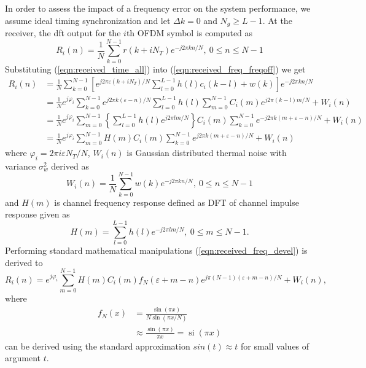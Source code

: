 In order to assess the impact of a frequency error on the system performance, we assume ideal timing synchronization and let $\Delta k = 0$ and $N_g \geq L-1$.
At the receiver, the \gls{dft} output for the $i$th OFDM symbol is computed as
%
\begin{equation}
\label{eqn:received_freq_freqoff}
R_i(n) =\frac{1}{N} \sum_{k=0}^{N-1} r(k+iN_T)e^{-j2\pi k n/N} ,\ 0 \leq n \leq N-1
\end{equation}
%
Substituting (\ref{eqn:received_time_all}) into (\ref{eqn:received_freq_freqoff}) we get
%
\begin{equation}
\label{eqn:received_freq_devel}
\begin{split}
R_i(n)
&=\frac{1}{N}\sum_{k=0}^{N-1}{\left[ e^{j2\pi \varepsilon(k+iN_T)/N}\sum_{l=0}^{L-1} {h(l)c_i(k-l)}+w(k)\right] e^{-j2\pi kn/N}}\\
&=\frac{1}{N}e^{j\varphi_i}\sum_{k=0}^{N-1}{e^{j2\pi k(\varepsilon-n)/N}}\sum_{l=0}^{L-1} {h(l)\sum_{m=0}^{N-1}{C_i(m)e^{j2\pi (k-l)m/N}}}+W_i(n)\\
&=\frac{1}{N}e^{j\varphi_i} \sum_{m=0}^{N-1} \left\lbrace \sum_{l=0}^{L-1} h(l)e^{j2\pi lm/N}\right\rbrace C_i(m)\sum_{k=0}^{N-1} e^{-j2\pi k (m+\varepsilon -n)/N}+W_i(n)\\
&=\frac{1}{N}e^{j\varphi_i} \sum_{m=0}^{N-1} H(m) C_i(m)\sum_{k=0}^{N-1} e^{j2\pi k (m+\varepsilon -n)/N} +W_i(n)
\end{split}
\end{equation}
%
%
where $\varphi_i = 2\pi i \varepsilon N_T/N$, $W_i(n)$ is Gaussian distributed thermal noise with variance $\sigma_{w}^2$ derived as
%
\begin{equation}
\label{eqn:noise_freq}
W_i(n) =\frac{1}{N} \sum_{k=0}^{N-1} w(k)e^{-j2\pi k n/N} ,\ 0 \leq n \leq N-1
\end{equation}
%
and $H(m)$ is {channel frequency response} defined as DFT of channel impulse response given as
%
\begin{equation}
\label{eqn:CFR}
H(m) =\sum_{l=0}^{L-1} h(l)e^{-j2\pi l m/N} ,\ 0 \leq m \leq N-1.
\end{equation}
%
Performing standard mathematical manipulations (\ref{eqn:received_freq_devel}) is derived to
%
\begin{equation}
\label{eqn:received_freq_developed}
R_i(n)=e^{j\varphi_i} \sum_{m=0}^{N-1} H(m) C_i(m)f_N(\varepsilon + m - n)e^{j\pi (N-1)(\varepsilon +m - n)/N} +W_i(n),
\end{equation}
%
where
%
\begin{equation}
\label{eqn:fN}
\begin{split}
f_N(x)
&= \frac{\sin(\pi x)}{N\sin(\pi x/N)}\\
&\approx \frac{\sin(\pi x)}{\pi x} = \operatorname{si}(\pi x)
\end{split}
\end{equation}
%
can be derived using the standard approximation $sin(t)\approx t$ for small values of argument $t$.

